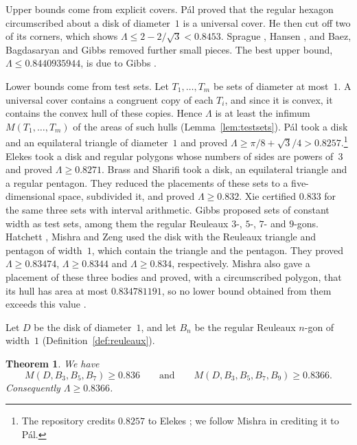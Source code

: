 \documentclass[11pt]{amsart}
\newtheorem{theorem}{Theorem}[section]
\theoremstyle{definition}
\theoremstyle{remark}
\numberwithin{equation}{section}
\newcommand{\LBFOUR}{0.836}
\newcommand{\LBFIVE}{0.8366}
\begin{document}
Upper bounds come from explicit covers. Pál \cite{Pal20} proved that the regular hexagon circumscribed about a disk of diameter~$1$ is a universal cover. He then cut off two of its corners, which shows $\Lambda\le2-2/\sqrt3<0.8453$. Sprague \cite{Spr36}, Hansen \cite{Han92}, and Baez, Bagdasaryan and Gibbs \cite{BBG15} removed further small pieces. The best upper bound, $\Lambda\le0.8440935944$, is due to Gibbs \cite{Gib18}.

Lower bounds come from test sets. Let $T_1,\dots,T_m$ be sets of diameter at most~$1$. A universal cover contains a congruent copy of each $T_i$, and since it is convex, it contains the convex hull of these copies. Hence $\Lambda$ is at least the infimum $M(T_1,\dots,T_m)$ of the areas of such hulls (Lemma~\ref{lem:testsets}). Pál \cite{Pal20} took a disk and an equilateral triangle of diameter~$1$ and proved $\Lambda\ge\pi/8+\sqrt3/4>0.8257$.\footnote{The repository \cite{Tao26} credits $0.8257$ to Elekes \cite{Ele94}; we follow Mishra \cite[Section~1]{Mis26} in crediting it to Pál.} Elekes \cite{Ele94} took a disk and regular polygons whose numbers of sides are powers of~$3$ and proved $\Lambda\ge0.8271$. Brass and Sharifi \cite{BS05} took a disk, an equilateral triangle and a regular pentagon. They reduced the placements of these sets to a five-dimensional space, subdivided it, and proved $\Lambda\ge0.832$. Xie \cite{Xie26} certified $0.833$ for the same three sets with interval arithmetic. Gibbs \cite{Gib14} proposed sets of constant width as test sets, among them the regular Reuleaux $3$-, $5$-, $7$- and $9$-gons. Hatchett \cite{Hat26}, Mishra \cite{Mis26} and Zeng \cite{Zen26} used the disk with the Reuleaux triangle and pentagon of width~$1$, which contain the triangle and the pentagon. They proved $\Lambda\ge0.83474$, $\Lambda\ge0.8344$ and $\Lambda\ge0.834$, respectively. Mishra also gave a placement of these three bodies and proved, with a circumscribed polygon, that its hull has area at most $0.834781191$, so no lower bound obtained from them exceeds this value \cite[Section~3]{Mis26}.

Let $D$ be the disk of diameter~$1$, and let $B_n$ be the regular Reuleaux $n$-gon of width~$1$ (Definition~\ref{def:reuleaux}).

\begin{theorem}\label{thm:main}
We have
\[
M(D,B_3,B_5,B_7)\ge\LBFOUR\qquad\text{and}\qquad M(D,B_3,B_5,B_7,B_9)\ge\LBFIVE.
\]
Consequently $\Lambda\ge\LBFIVE$.
\end{theorem}
\end{document}
